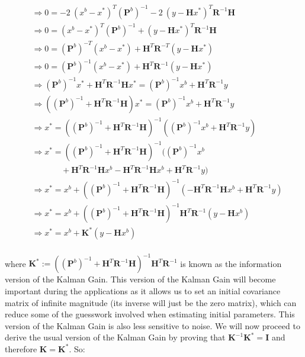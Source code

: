 \documentclass{article}
\begin{document}
\begin{align*}
&\Rightarrow 0 = -2 \: (x^b - x^*)^T (\mathbf{P}^b)^{-1} - 2 \: (y - \mathbf{H} x^*)^T \mathbf{R}^{-1} \mathbf{H} \\
&\Rightarrow 0 = (x^b - x^*)^T (\mathbf{P}^b)^{-1} + (y - \mathbf{H} x^*)^T \mathbf{R}^{-1} \mathbf{H} \\
&\Rightarrow 0 = (\mathbf{P}^b)^{-T} (x^b - x^*) + \mathbf{H}^T \mathbf{R}^{-T} (y - \mathbf{H} x^*) \\
&\Rightarrow 0 = (\mathbf{P}^b)^{-1} (x^b - x^*) + \mathbf{H}^T \mathbf{R}^{-1} (y - \mathbf{H} x^*) \\
&\Rightarrow (\mathbf{P}^b)^{-1} x^* + \mathbf{H}^T \mathbf{R}^{-1} \mathbf{H} x^* = (\mathbf{P}^b)^{-1} x^b + \mathbf{H}^T \mathbf{R}^{-1} y \\
&\Rightarrow ((\mathbf{P}^b)^{-1} + \mathbf{H}^T \mathbf{R}^{-1} \mathbf{H}) x^* = (\mathbf{P}^b)^{-1} x^b + \mathbf{H}^T \mathbf{R}^{-1} y \\
&\Rightarrow x^* = ((\mathbf{P}^b)^{-1} + \mathbf{H}^T \mathbf{R}^{-1} \mathbf{H})^{-1} ((\mathbf{P}^b)^{-1} x^b + \mathbf{H}^T \mathbf{R}^{-1} y) \\
&\Rightarrow x^* = ((\mathbf{P}^b)^{-1} + \mathbf{H}^T \mathbf{R}^{-1} \mathbf{H})^{-1} ((\mathbf{P}^b)^{-1} x^b \\
& \: \: \: \: \: \: \: \: \: \: \: \: \: \: \: \: + \mathbf{H}^T \mathbf{R}^{-1} \mathbf{H} x^b - \mathbf{H}^T \mathbf{R}^{-1} \mathbf{H} x^b + \mathbf{H}^T \mathbf{R}^{-1} y) \\
&\Rightarrow x^* = x^b + ((\mathbf{P}^b)^{-1} + \mathbf{H}^T \mathbf{R}^{-1} \mathbf{H})^{-1} (- \mathbf{H}^T \mathbf{R}^{-1} \mathbf{H} x^b + \mathbf{H}^T \mathbf{R}^{-1} y) \\
&\Rightarrow x^* = x^b + ((\mathbf{P}^b)^{-1} + \mathbf{H}^T \mathbf{R}^{-1} \mathbf{H})^{-1} \mathbf{H}^T \mathbf{R}^{-1} (y - \mathbf{H} x^b) \\
&\Rightarrow x^* = x^b + \mathbf{K}^* (y - \mathbf{H} x^b) \\
\end{align*}

where $\mathbf{K}^* := ((\mathbf{P}^b)^{-1} + \mathbf{H}^T \mathbf{R}^{-1} \mathbf{H})^{-1} \mathbf{H}^T \mathbf{R}^{-1}$ is known as the information version of the Kalman Gain. This version of the Kalman Gain will become important during the applications as it allows us to set an initial covariance matrix of infinite magnitude (its inverse will just be the zero matrix), which can reduce some of the guesswork involved when estimating initial parameters. This version of the Kalman Gain is also less sensitive to noise. We will now proceed to derive the usual version of the Kalman Gain by proving that $\mathbf{K}^{-1} \mathbf{K}^* = \mathbf{I}$ and therefore $\mathbf{K} = \mathbf{K}^*$. So:
\end{document}
